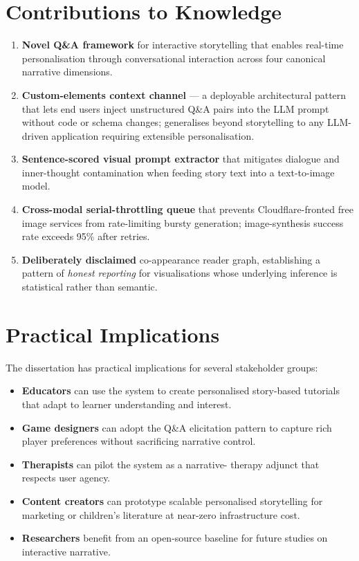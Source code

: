 \section{Contributions to Knowledge}
\begin{enumerate}
    \item \textbf{Novel Q\&A framework} for interactive
    storytelling that enables real-time personalisation through
    conversational interaction across four canonical narrative
    dimensions.
    \item \textbf{Custom-elements context channel} --- a deployable
    architectural pattern that lets end users inject unstructured
    Q\&A pairs into the LLM prompt without code or schema changes;
    generalises beyond storytelling to any LLM-driven application
    requiring extensible personalisation.
    \item \textbf{Sentence-scored visual prompt extractor} that
    mitigates dialogue and inner-thought contamination when feeding
    story text into a text-to-image model.
    \item \textbf{Cross-modal serial-throttling queue} that prevents
    Cloudflare-fronted free image services from rate-limiting
    bursty generation; image-synthesis success rate exceeds 95\%
    after retries.
    \item \textbf{Deliberately disclaimed} co-appearance reader graph,
    establishing a pattern of \emph{honest reporting} for
    visualisations whose underlying inference is statistical rather
    than semantic.
\end{enumerate}

\section{Practical Implications}
The dissertation has practical implications for several stakeholder
groups:

\begin{itemize}
    \item \textbf{Educators} can use the system to create
    personalised story-based tutorials that adapt to learner
    understanding and interest.
    \item \textbf{Game designers} can adopt the Q\&A elicitation
    pattern to capture rich player preferences without sacrificing
    narrative control.
    \item \textbf{Therapists} can pilot the system as a narrative-
    therapy adjunct that respects user agency.
    \item \textbf{Content creators} can prototype scalable
    personalised storytelling for marketing or children's literature
    at near-zero infrastructure cost.
    \item \textbf{Researchers} benefit from an open-source baseline
    \cite{jha2026repo} for future studies on interactive narrative.
\end{itemize}

